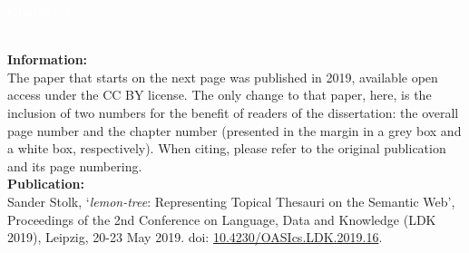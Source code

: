 \noindent{\color{white}\rule{\textwidth}{0.01em}}
\checkoddpage\ifoddpage\newpage\mbox{}\else\fi

\thispagestyle{empty}


\begin{center}
\setlength\fboxsep{1cm}
\noindent\colorbox{evokelightblue}{
\parbox[c][1.0in-2cm]{\textwidth-2cm}{\RaggedLeft\Huge \textbf{\textcolor{white}{Chapter 5}}}}
\end{center}

\noindent{\color{lightgray}\rule{\textwidth}{0.4em}}
\\[2em]
\noindent\textbf{Information:}\\
The paper that starts on the next page was published in 2019, available open access under the CC BY license. The only change to that paper, here, is the inclusion of two numbers for the benefit of readers of the dissertation: the overall page number and the chapter number (presented in the margin in a grey box and a white box, respectively). When citing, please refer to the original publication and its page numbering.
\\[1em]
\noindent\textbf{Publication:}\\
    Sander Stolk, `\emph{lemon-tree}: Representing Topical Thesauri on the Semantic Web', Proceedings of the 2nd Conference on Language, Data and Knowledge (LDK 2019), Leipzig, 20-23 May 2019. doi: \href{https://doi.org/10.4230/OASIcs.LDK.2019.16}{\url{10.4230/OASIcs.LDK.2019.16}}.
\noindent
\\[1em]
\noindent{\color{lightgray}\rule{\textwidth}{0.4em}}
